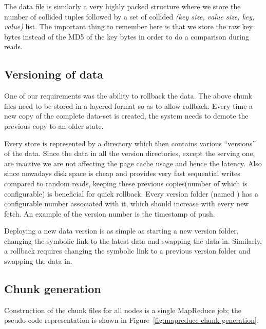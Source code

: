 The data file is similarly a very highly packed structure where we
store the number of collided tuples followed by a set of collided
\emph{(key size, value size, key, value)} list. The important thing to
remember here is that we store the raw key bytes instead of the MD5 of the
key bytes in order to do a comparison during reads. 


\subsection{Versioning of data}
\label{sec:read_only:versioning}

One of our requirements was the ability to rollback the data. The
above chunk files need to be stored in a layered format so as to allow
rollback. Every time a new copy of the complete data-set is created,
the system needs to demote the previous copy to an older state.

Every store is represented by a directory which then contains various
``versions'' of the data. Since the data in all the version
directories, except the serving one, are inactive we are not affecting
the page cache usage and hence the latency. Also since nowadays disk
space is cheap and provides very fast sequential writes compared to
random reads, keeping these previous copies(number of which is
configurable) is beneficial for quick rollback. Every version folder
(named ) has a configurable number associated
with it, which should increase with every new fetch. An example of the
version number is the timestamp of push. 

Deploying a new data version is as simple as starting a new version
folder, changing the symbolic link to the latest data and swapping the
data in. Similarly, a rollback requires changing the symbolic link to a 
previous version folder and swapping the data in. 


\subsection{Chunk generation}
\label{sec:read_only:chunk_generation}

Construction of the chunk files for all \projectname{} nodes is a
single MapReduce job; the pseudo-code representation is shown in
Figure~\ref{fig:mapreduce-chunk-generation}.

